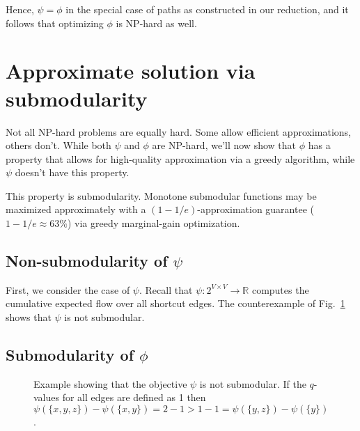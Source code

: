 \documentclass[11pt,letterpaper]{article}
\newcommand{\reals}{\mathbb{R}}
\begin{document}
Hence, $\psi=\phi$ in the special case of paths as constructed in our reduction, and it follows that optimizing $\phi$ is NP-hard as well.



\section{Approximate solution via submodularity}

Not all NP-hard problems are equally hard. Some allow efficient approximations, others don't.
While both $\psi$ and $\phi$ are NP-hard, we'll now show that $\phi$ has a property that allows for high-quality approximation via a greedy algorithm, while $\psi$ doesn't have this property.

This property is submodularity.
Monotone submodular functions may be maximized approximately with a $(1-1/e)$-approximation guarantee ($1-1/e \approx 63\%$) via greedy marginal\hyp gain optimization.

\subsection{Non-submodularity of $\psi$}

First, we consider the case of $\psi$.
Recall that $\psi : 2^{V \times V} \rightarrow \reals$ computes the cumulative expected flow over all shortcut edges.
The counterexample of Fig.~\ref{fig:counterexample} shows that $\psi$ is not submodular.

\subsection{Submodularity of $\phi$}

\begin{figure}
 \centering
{}

\caption{Example showing that the objective $\psi$ is not submodular. If the $q$-values for all edges are defined as 1 then $\psi(\{x,y,z\}) - \psi(\{x,y\}) = 2-1 > 1-1 = \psi(\{y,z\}) - \psi(\{y\})$.}
 \label{fig:counterexample}
\end{figure}
\end{document}
